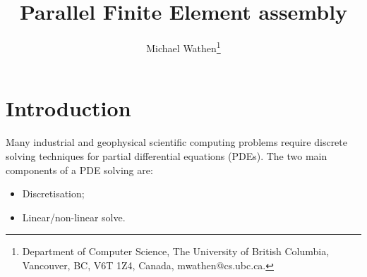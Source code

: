 \documentclass{article}
\title{Parallel Finite Element assembly}
\author{
 Michael Wathen\thanks{Department of Computer Science,
The University of British Columbia, Vancouver, BC, V6T 1Z4, Canada,
 mwathen@cs.ubc.ca.}
}
\begin{document}
\maketitle

\begin{abstract}

\end{abstract}



\section{Introduction}

Many industrial and geophysical scientific computing problems require discrete solving techniques for partial differential equations (PDEs). The two main components of a PDE solving are:
\begin{itemize}
    \item Discretisation;
    \item Linear/non-linear solve.
\end{itemize}



\end{document}
